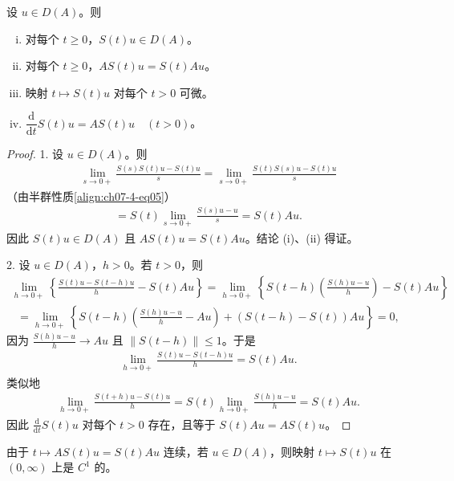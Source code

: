 \documentclass[../../main.tex]{subfiles}
\begin{document}
\begin{theorem}[半群的微分性质。]\label{theorem:ch07-4-半群的微分性质}设 $u\in D(A)$。则
\begin{enumerate}[(i)]
\item 对每个 $t\geqslant 0$，$S(t)u\in D(A)$。
\item 对每个 $t\geqslant 0$，$AS(t)u=S(t)Au$。
\item 映射 $t\mapsto S(t)u$ 对每个 $t>0$ 可微。
\item $\dfrac{\mathrm{d}}{\mathrm{d}t}S(t)u=AS(t)u\quad (t>0)$。
\end{enumerate}
\end{theorem}

\begin{proof}
1. 设 $u\in D(A)$。则
\begin{align*}
\lim_{s\to 0+}\frac{S(s)S(t)u-S(t)u}{s}
=\lim_{s\to 0+}\frac{S(t)S(s)u-S(t)u}{s}
\end{align*}
（由半群性质\eqref{align:ch07-4-eq05}）
\begin{align*}
=S(t)\lim_{s\to 0+}\frac{S(s)u-u}{s}=S(t)Au.
\end{align*}
因此 $S(t)u\in D(A)$ 且 $AS(t)u=S(t)Au$。结论 (i)、(ii) 得证。

2. 设 $u\in D(A)$，$h>0$。若 $t>0$，则
\begin{align*}
\lim_{h\to 0+}\left\{\frac{S(t)u-S(t-h)u}{h}-S(t)Au\right\}
=\lim_{h\to 0+}\left\{S(t-h)\left(\frac{S(h)u-u}{h}\right)-S(t)Au\right\}
\end{align*}
\begin{align*}
=\lim_{h\to 0+}\left\{S(t-h)\left(\frac{S(h)u-u}{h}-Au\right)+(S(t-h)-S(t))Au\right\}=0,
\end{align*}
因为 $\frac{S(h)u-u}{h}\to Au$ 且 $\|S(t-h)\|\leqslant 1$。于是
\begin{align*}
\lim_{h\to 0+}\frac{S(t)u-S(t-h)u}{h}=S(t)Au.
\end{align*}
类似地
\begin{align*}
\lim_{h\to 0+}\frac{S(t+h)u-S(t)u}{h}
=S(t)\lim_{h\to 0+}\frac{S(h)u-u}{h}=S(t)Au.
\end{align*}
因此 $\frac{\mathrm{d}}{\mathrm{d}t}S(t)u$ 对每个 $t>0$ 存在，且等于 $S(t)Au=AS(t)u$。
\end{proof}

\begin{remark}\label{remark:ch07-4-C1光滑}
由于 $t\mapsto AS(t)u=S(t)Au$ 连续，若 $u\in D(A)$，则映射 $t\mapsto S(t)u$ 在 $(0,\infty)$ 上是 $C^1$ 的。
\end{remark}
\end{document}
